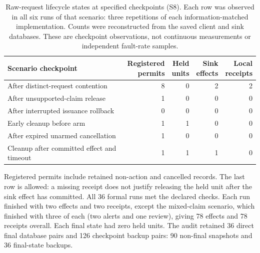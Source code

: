 \begin{table}[!htbp]
\centering
\small
\setlength{\tabcolsep}{4pt}
\renewcommand{\arraystretch}{1.14}
\caption{Raw-request lifecycle states at specified checkpoints (S8). Each row was observed in all six runs of that scenario: three repetitions of each information-matched implementation. Counts were reconstructed from the saved client and sink databases. These are checkpoint observations, not continuous measurements or independent fault-rate samples.}
\label{tab:lifecycle-states}
\begin{tabularx}{\linewidth}{@{}>{\raggedright\arraybackslash}Xrrrr@{}}
\toprule
Scenario checkpoint & \shortstack{Registered\\permits} & \shortstack{Held\\units} & \shortstack{Sink\\effects} & \shortstack{Local\\receipts}\\
\midrule
After distinct-request contention & 8 & 0 & 2 & 2 \\
After unsupported-claim release & 1 & 0 & 0 & 0 \\
After interrupted issuance rollback & 0 & 0 & 0 & 0 \\
Early cleanup before arm & 1 & 1 & 0 & 0 \\
After expired unarmed cancellation & 1 & 0 & 0 & 0 \\
Cleanup after committed effect and timeout & 1 & 1 & 1 & 0 \\
\bottomrule
\end{tabularx}
\par\smallskip
\begin{minipage}{\linewidth}\small
Registered permits include retained non-action and cancelled records. The last row is allowed: a missing receipt does not justify releasing the held unit after the sink effect has committed. All 36 formal runs met the declared checks. Each run finished with two effects and two receipts, except the mixed-claim scenario, which finished with three of each (two alerts and one review), giving 78 effects and 78 receipts overall. Each final state had zero held units. The audit retained 36 direct final database pairs and 126 checkpoint backup pairs: 90 non-final snapshots and 36 final-state backups.
\end{minipage}
\end{table}
